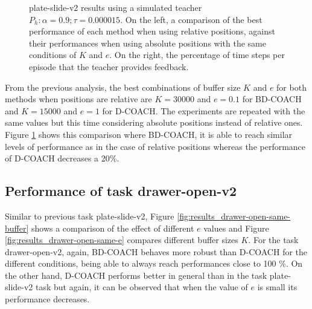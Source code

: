  \begin{figure}[H]
  \centering

  \caption{plate-slide-v2 results using a simulated teacher $P_h: \alpha = 0.9; \tau =  0.000015$. On the left, a comparison of the best performance of each method when using relative positions, against their performances when using absolute positions with the same conditions of $K$ and $e$. On the right, the percentage of time steps per episode that the teacher  provides feedback.}
  \label{fig:results-plate-slide-best}
\end{figure}











      
From the previous analysis, the best combinations of buffer size $K$ and $e$ for both methods when positions are relative are $K=30000$ and $e=0.1$ for BD-COACH and $K=15000$ and $e=1$ for D-COACH. The experiments are repeated with the same values but this time considering absolute positions instead of relative ones. Figure \ref{fig:results-plate-slide-best} shows this comparison where BD-COACH, it is able to reach similar levels of performance as in the case of relative positions whereas the performance of D-COACH decreases a 20\%.


\subsection{Performance of task drawer-open-v2}
\label{subsection:Performance of task drawer_open_v2}




Similar to previous task plate-slide-v2, Figure \ref{fig:results_drawer-open-same-buffer} shows a comparison of the effect of different $e$ values and Figure \ref{fig:results_drawer-open-same-e} compares different buffer sizes $K$. For the task drawer-open-v2, again, BD-COACH behaves more robust than D-COACH for the different conditions, being able to always reach performances close to 100 \%. On the other hand, D-COACH performs better in general than in the task plate-slide-v2 task but again, it can be observed that when the value of $e$ is small its performance decreases.



